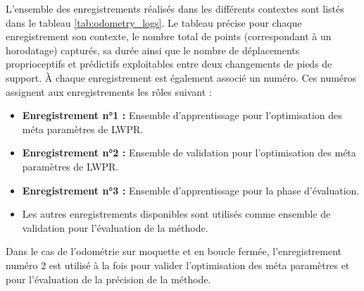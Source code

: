 L'ensemble des enregistrements réalisés dans les différents contextes 
sont listés dans le tableau \ref{tab:odometry_logs}.
Le tableau précise pour chaque enregistrement son contexte, le nombre total de 
points (correspondant à un horodatage) capturés, sa durée ainsi que 
le nombre de déplacements proprioceptifs et prédictifs exploitables 
entre deux changements de pieds de support.
À chaque enregistrement est également associé un numéro.
Ces numéros assignent aux enregistrements les rôles suivant :
\begin{itemize}
    \item \textbf{Enregistrement n°1 : }Ensemble d'apprentissage pour l'optimisation des méta paramètres de LWPR.
    \item \textbf{Enregistrement n°2 : }Ensemble de validation pour l'optimisation des méta paramètres de LWPR.
    \item \textbf{Enregistrement n°3 : }Ensemble d'apprentissage pour la phase d'évaluation.
    \item Les autres enregistrements disponibles sont utilisés comme ensemble de validation 
        pour l'évaluation de la méthode.
\end{itemize}
Dans le cas de l'odométrie sur moquette et en boucle fermée, l'enregistrement numéro 2 
est utilisé à la fois pour valider l'optimisation des méta paramètres et pour 
l'évaluation de la précision de la méthode.

